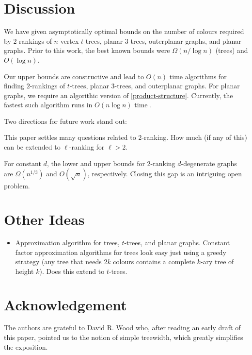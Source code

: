 \documentclass[kpfonts]{patmorin}
\theoremstyle{named}
\begin{document}
\section{Discussion}
\label{conclusion}

We have given asymptotically optimal bounds on the number of colours required by $2$-rankings of $n$-vertex $t$-trees, planar 3-trees, outerplanar graphs, and planar graphs.  Prior to this work, the best known bounds were $\Omega(n/\log n)$ (trees) and $O(\log n)$.

Our upper bounds are constructive and lead to $O(n)$ time algorithms for finding $2$-rankings of $t$-trees, planar 3-trees, and outerplanar graphs.  For planar graphs, we require an algorithic version of \cref{product-structure}. Currently, the fastest such algorithm runs in $O(n\log n)$ time \cite{morin:fast}.

Two directions for future work stand out:
\begin{inparaenum}[(i)]
    \item This paper settles many questions related to $2$-ranking.  How much (if any of this) can be extended to $\ell$-ranking for $\ell>2$.
    \item For constant $d$, the lower and upper bounds for 2-ranking $d$-degenerate graphs are $\Omega(n^{1/3})$ and $O(\sqrt{n})$, respectively.  Closing this gap is an intriguing open problem.
\end{inparaenum}

\section{Other Ideas}

\begin{itemize}
\item Approximation algorithm for trees, $t$-trees, and planar graphs.  Constant factor approximation algorithms for trees look easy just using a greedy strategy (any tree that needs $2k$ colours contains a complete $k$-ary tree of height $k$).  Does this extend to $t$-trees.
\end{itemize}


\section*{Acknowledgement}

The authors are grateful to David R. Wood who, after reading an early draft of this paper, pointed us to the notion of simple treewidth, which greatly simplifies the exposition.




\end{document}
